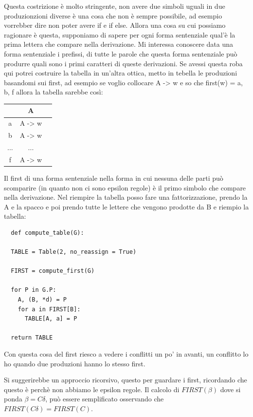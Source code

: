 Questa costrizione è molto stringente, non avere due simboli uguali in due produzionzioni diverse è una cosa che non è sempre possibile, ad esempio vorrebber dire non poter avere if e if else.
Allora una cosa su cui possiamo ragionare è questa, supponiamo di sapere per ogni forma sentenziale qual'è la prima lettera che compare nella derivazione. Mi interessa conoscere data una forma sentenziale i prefissi, di tutte le parole che questa forma sentenziale può produrre quali sono i primi caratteri di queste derivazioni.
Se avessi questa roba qui potrei costruire la tabella in un'altra ottica, metto in tebella le produzioni basandomi sui first, ad esempio se voglio collocare A -> w e so che first(w) = a, b, f allora la tabella sarebbe così:
\begin{table}[ht!]
  \centering
  \begin{tabular}{|c|c|c|}
    \hline
    & \textbf{A} \\ \hline
    a & A -> w\\ \hline
    b & A -> w  \\ \hline
    ... & ... \\ \hline
    f & A -> w \\ \hline
  \end{tabular}
\end{table}

Il first di una forma sentenziale nella forma in cui nessuna delle parti può scomparire (in quanto non ci sono epsilon regole) è il primo simbolo che compare nella derivazione. Nel riempire la tabella posso fare una fattorizzazione, prendo la A e la spacco e poi prendo tutte le lettere che vengono prodotte da B e riempio la tabella:
\begin{lstlisting}
  def compute_table(G):

  TABLE = Table(2, no_reassign = True)

  FIRST = compute_first(G)

  for P in G.P:
    A, (B, *d) = P
    for a in FIRST[B]:
      TABLE[A, a] = P

  return TABLE
\end{lstlisting}

Con questa cosa del first riesco a vedere i conflitti un po' in avanti, un conflitto lo ho quando due produzioni hanno lo stesso first.

Si suggerirebbe un approccio ricorsivo, questo per guardare i first, ricordando che questo è perchè non abbiamo le epsilon regole. Il calcolo di $FIRST(\beta)$ dove si ponda $\beta = C\delta$, può essere semplificato osservando che $FIRST(C\delta) = FIRST(C)$.

